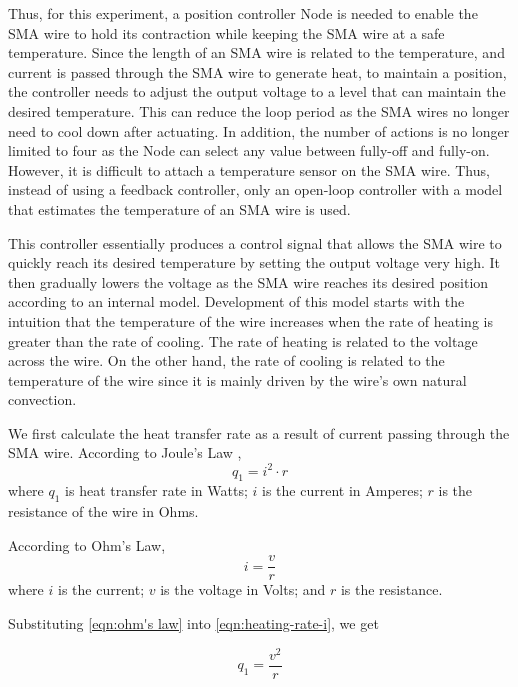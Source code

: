 Thus, for this experiment, a position controller Node is needed to enable the SMA wire to hold its contraction while keeping the SMA wire at a safe temperature. Since the length of an SMA wire is related to the temperature, and current is passed through the SMA wire to generate heat, to maintain a position, the controller needs to adjust the output voltage to a level that can maintain the desired temperature. This can reduce the loop period as the SMA wires no longer need to cool down after actuating. In addition, the number of actions is no longer limited to four as the Node can select any value between fully-off and fully-on. However, it is difficult to attach a temperature sensor on the SMA wire. Thus, instead of using a feedback controller, only an open-loop controller with a model that estimates the temperature of an SMA wire is used.

This controller essentially produces a control signal that allows the SMA wire to quickly reach its desired temperature by setting the output voltage very high. It then gradually lowers the voltage as the SMA wire reaches its desired position according to an internal model. Development of this model starts with the intuition that the temperature of the wire increases when the rate of heating is greater than the rate of cooling. The rate of heating is related to the voltage across the wire. On the other hand, the rate of cooling is related to the temperature of the wire since it is mainly driven by the wire's own natural convection. 

We first calculate the heat transfer rate as a result of current passing through the SMA wire. According to Joule's Law \cite{JoulesLaw},
\begin{equation}
q_1 = i^2 \cdot r
\end{equation}
where $q_1$ is heat transfer rate in Watts; $i$ is the current in Amperes; $r$ is the resistance of the wire in Ohms.

According to Ohm's Law, 
\begin{equation}\label{eqn:ohm's law}
i = \frac{v}{r}
\end{equation}
where $i$ is the current; $v$ is the voltage in Volts; and $r$ is the resistance.

Substituting \eqref{eqn:ohm's law} into \eqref{eqn:heating-rate-i}, we get

\begin{equation}\label{eqn:heating-rate-v}
q_1 = \frac{v^2}{r}
\end{equation}


